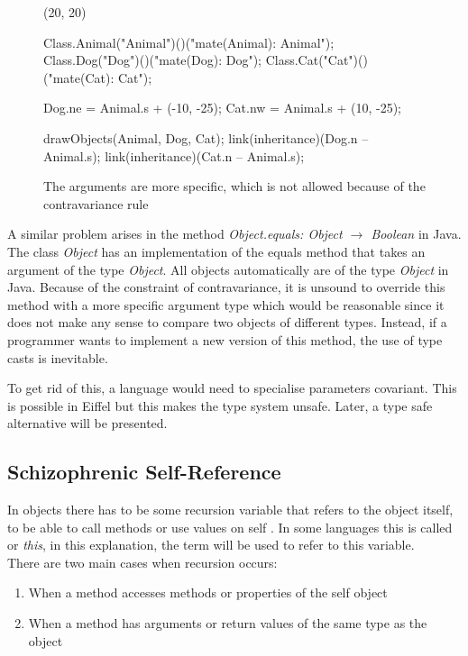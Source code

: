 \begin{figure}[H]
	\centering
	\begin{emp}[classdiag](20, 20)

		Class.Animal("Animal")()("mate(Animal): Animal");
		Class.Dog("Dog")()("mate(Dog): Dog");
		Class.Cat("Cat")()("mate(Cat): Cat");

		Dog.ne = Animal.s + (-10, -25);
		Cat.nw = Animal.s + (10, -25);

		drawObjects(Animal, Dog, Cat);
		link(inheritance)(Dog.n -- Animal.s);
		link(inheritance)(Cat.n -- Animal.s);

	\end{emp}
	\caption{The arguments are more specific, which is not allowed because of the contravariance rule}
	\label{fig:animalContravariance}
\end{figure}

A similar problem arises in the method \emph{Object.equals: Object
$\rightarrow$ Boolean} in Java. The class \emph{Object} has an
implementation of the equals method that takes an argument of the type
\emph{Object}. All objects automatically are of the type \emph{Object}
in Java.    Because of the constraint of contravariance, it is unsound
to override this method with a more specific argument type which would
be reasonable since it does not make any sense to compare two objects
of different types. Instead, if a programmer wants to implement a new
version of this method, the use of type casts is inevitable.

To get rid of this, a language would need to specialise parameters
covariant. This is possible in Eiffel but this makes the type system
unsafe. Later, a type safe alternative will be presented.

\subsection{Schizophrenic Self-Reference}
\label{sec:schizoReferences}

In objects there has to be some recursion variable that refers to the
object itself, to be able to call methods or use values on self . In some
languages this is called \self or \emph{this}, in this explanation,
the term \self will be used to refer to this variable. \\

There are two main cases when recursion occurs:
\begin{enumerate}
	\item When a method accesses methods or properties of the self object
	\item When a method has arguments or return values of the same type as the object
\end{enumerate}


